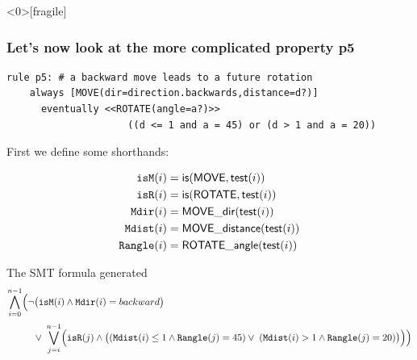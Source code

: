 \begin{frame}<0>[fragile]
  \frametitle{Let's now look at the more complicated property p5} \small

\begin{lstlisting}[language=fuzzdsl,frame=single]
  rule p5: # a backward move leads to a future rotation
    always [MOVE(dir=direction.backwards,distance=d?)] 
      eventually <<ROTATE(angle=a?)>> 
                     ((d <= 1 and a = 45) or (d > 1 and a = 20))  
\end{lstlisting}

\pause

\vspace{-0.3cm}

First we define some shorthands:
\hfill
\begin{minipage}{0.55\linewidth}
{\scriptsize
\begin{align*}
\mathtt{isM}(i)    &= \mathsf{is}(\mathsf{MOVE}, \mathsf{test}(i)) \\
\mathtt{isR}(i)    &= \mathsf{is}(\mathsf{ROTATE}, \mathsf{test}(i)) \\
\mathtt{Mdir}(i)   &= \mathsf{MOVE\_dir}(\mathsf{test}(i)) \\
\mathtt{Mdist}(i)  &= \mathsf{MOVE\_distance}(\mathsf{test}(i)) \\
\mathtt{Rangle}(i) &= \mathsf{ROTATE\_angle}(\mathsf{test}(i)) \\
\end{align*}
}
\end{minipage}

\pause

\vspace{-0.3cm}

\begin{block}{The SMT formula generated}
{\scriptsize
\[
\begin{aligned}
\bigwedge_{i=0}^{n-1} \Bigl(
   & \neg\bigl(\mathtt{isM}(i) \wedge \mathtt{Mdir}(i)=backward\bigr) \\[0.5ex]
   & \;\;\vee\;
     \bigvee_{j=i}^{n-1} \Bigl(
        \mathtt{isR}(j) \wedge
        \bigl(
           (\mathtt{Mdist}(i)\le 1 \wedge \mathtt{Rangle}(j)=45) 
           \vee\;
           (\mathtt{Mdist}(i) > 1 \wedge \mathtt{Rangle}(j)=20)
        \bigr)
     \Bigr)
\Bigr)
\end{aligned}
\]
}
\end{block}

\end{frame}


